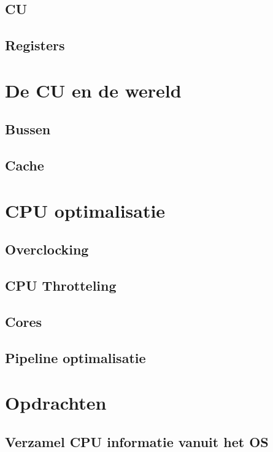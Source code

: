 \documentclass[a4paper,12pt,twoside,openright,titlepage]{book}
\begin{document}
\section{CU}


\section{Registers}


\chapter{De CU en de wereld}
\section{Bussen}

\section{Cache}


\chapter{CPU optimalisatie}
\section{Overclocking}

\section{CPU Throtteling}

\section{Cores}

\section{Pipeline optimalisatie}


\chapter{Opdrachten}
\section{Verzamel CPU informatie vanuit het OS}


\backmatter
\printindex
\end{document}

